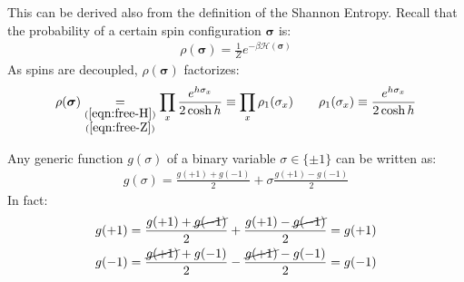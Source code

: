 \documentclass[../template.tex]{subfiles}
\begin{document}
\begin{example}
    This can be derived also from the definition of the Shannon Entropy. Recall that the probability of a certain spin configuration $\bm{\sigma}$ is:
    \begin{align*}
        \rho(\bm{\sigma}) = \frac{1}{Z} e^{- \beta \mathcal{H}(\bm{\sigma})} 
    \end{align*}
    As spins are decoupled, $\rho(\bm{\sigma})$ factorizes: 
    \begin{align}\label{eqn:rho1}
        \rho(\bm{\sigma}) \underset{\substack{(\ref{eqn:free-H})\\(\ref{eqn:free-Z})}}{=}  \prod_x \frac{e^{h \sigma_x}}{2 \cosh h}  \equiv \prod_x \rho_1(\sigma_x) \qquad \rho_1(\sigma_x) \equiv \frac{e^{h \sigma_x}}{2 \cosh h} 
    \end{align}

    Any generic function $g(\sigma)$ of a binary variable $\sigma \in \{\pm 1\}$ can be written as:
    \begin{align*}
        g(\sigma) = \frac{g(+1) + g(-1)}{2} + \sigma \frac{g(+1) - g(-1)}{2}  
    \end{align*}
    In fact:
    \begin{align*}
        g(+1) &= \frac{g(+1) + \cancel{g(-1)}}{2} +\frac{g(+1) - \cancel{g(-1)}}{2} = g(+1)\\
        g(-1) &= \frac{\cancel{g(+1)} + g(-1)}{2} - \frac{\cancel{g(+1)} - g(-1)}{2} = g(-1)
    \end{align*}


\end{example}
\end{document}
